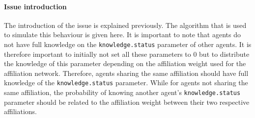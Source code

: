 \paragraph{Issue introduction}


The introduction of the issue is explained previously. The algorithm that is used to simulate this behaviour is given here. It is important to note that agents do not have full knowledge on the \texttt{knowledge.status} parameter of other agents. It is therefore important to initially not set all these parameters to 0 but to distribute the knowledge of this parameter depending on the affiliation weight used for the affiliation network. Therefore, agents sharing the same affiliation should have full knowledge of the \texttt{knowledge.status} parameter. While for agents not sharing the same affiliation, the probability of knowing another agent's \texttt{knowledge.status} parameter should be related to the affiliation weight between their two respective affiliations.






